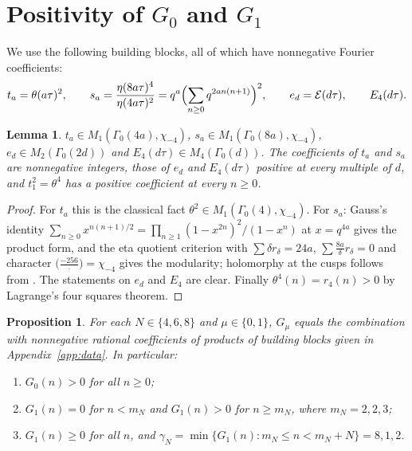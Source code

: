 \documentclass[11pt]{amsart}
\newtheorem{proposition}[theorem]{Proposition}
\newtheorem{lemma}[theorem]{Lemma}
\theoremstyle{definition}
\newcommand{\Ei}{\mathcal{E}}
\begin{document}
\section{Positivity of \texorpdfstring{$G_0$}{G\_0} and \texorpdfstring{$G_1$}{G\_1}}\label{sec:reps}

We use the following building blocks, all of which have nonnegative Fourier coefficients:
\[
t_a=\theta(a\tau)^2,\qquad s_a=\frac{\eta(8a\tau)^4}{\eta(4a\tau)^2}=q^a\Bigl(\sum_{n\ge0}q^{2an(n+1)}\Bigr)^2,\qquad e_d=\Ei(d\tau),\qquad E_4(d\tau).
\]

\begin{lemma}\label{lem:blocks}
$t_a\in M_1(\Gamma_0(4a),\chi_{-4})$, $s_a\in M_1(\Gamma_0(8a),\chi_{-4})$, $e_d\in M_2(\Gamma_0(2d))$ and $E_4(d\tau)\in M_4(\Gamma_0(d))$. The coefficients of $t_a$ and $s_a$ are nonnegative integers, those of $e_d$ and $E_4(d\tau)$ positive at every multiple of $d$, and $t_1^2=\theta^4$ has a positive coefficient at every $n\ge0$.
\end{lemma}

\begin{proof}
For $t_a$ this is the classical fact $\theta^2\in M_1(\Gamma_0(4),\chi_{-4})$. For $s_a$: Gauss's identity $\sum_{n\ge0}x^{n(n+1)/2}=\prod_{n\ge1}(1-x^{2n})^2/(1-x^n)$ at $x=q^{4a}$ gives the product form, and the eta quotient criterion \cite[Theorem~1.64]{Ono04} with $\sum\delta r_\delta=24a$, $\sum\frac{8a}\delta r_\delta=0$ and character $\bigl(\frac{-256}\cdot\bigr)=\chi_{-4}$ gives the modularity; holomorphy at the cusps follows from \cite[Theorem~1.65]{Ono04}. The statements on $e_d$ and $E_4$ are clear. Finally $\theta^4(n)=r_4(n)>0$ by Lagrange's four squares theorem.
\end{proof}

\begin{proposition}\label{prop:reps}
For each $N\in\{4,6,8\}$ and $\mu\in\{0,1\}$, $G_\mu$ equals the combination with nonnegative rational coefficients of products of building blocks given in Appendix~\ref{app:data}. In particular:
\begin{enumerate}
\item $G_0(n)>0$ for all $n\ge0$;
\item $G_1(n)=0$ for $n<m_N$ and $G_1(n)>0$ for $n\ge m_N$, where $m_N=2,2,3$;
\item $G_1(n)\ge0$ for all $n$, and $\gamma_N=\min\{G_1(n):m_N\le n<m_N+N\}=8,1,2$.
\end{enumerate}
\end{proposition}
\end{document}
